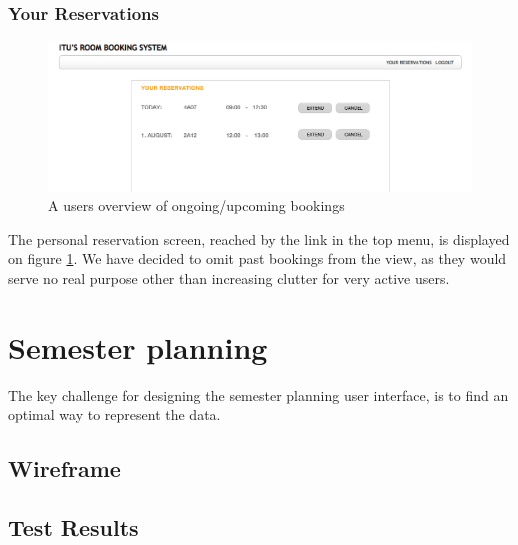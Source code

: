 \subsubsection*{Your Reservations}
\begin{figure}[htb]
\begin{center}
\leavevmode
\includegraphics[width=1\textwidth]{images/screens/reservations}
\end{center}
\caption{A users overview of ongoing/upcoming bookings}
\label{fig:reservations}
\end{figure}
The personal reservation screen, reached by the link in the top menu, is displayed on figure \ref{fig:reservations}. We have decided to omit past bookings from the view, as they would serve no real purpose other than increasing clutter for very active users.

\section{Semester planning}
\label{sec:semester_planning_ui}
The key challenge for designing the semester planning user interface, is to find an optimal way to represent the data.

\subsection{Wireframe}
\label{subsec:wire_sem}


\subsection{Test Results}
\label{subsec:test_results_sp}

